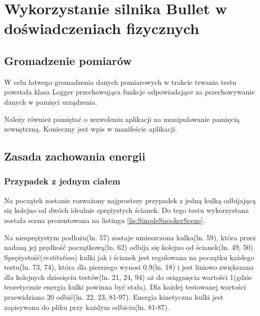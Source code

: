 \section{Wykorzystanie silnika Bullet w doświadczeniach fizycznych}

\subsection{Gromadzenie pomiarów}
W celu łatwego gromadzenia danych pomiarowych w trakcie trwania testu powstała
klasa Logger przechowująca funkcje odpowiadające za przechowywanie danych w
pamięci urządzenia.
  
Należy również pamiętać o zezwoleniu aplikacji na manipulowanie pamięcią
zewnętrzną. Konieczny jest wpis w manifeście aplikacji.


\subsection{Zasada zachowania energii}

\subsubsection{Przypadek z jednym ciałem}
Na początek zostanie rozważony najprostszy przypadek z jedną kulką odbijającą
się kolejno od dwóch idealnie sprężystych ścianek. Do tego testu wykorzystana
została scena prezentowana na listingu \ref{lis:SimpleSnookerScene}.
 
Na niesprężystym podłożu(ln. 57) zostaje umieszczona kulka(ln. 59), która przez
nadaną jej prędkość początkową(ln. 62) odbija się kolejno od ścianek(ln. 49,
50). Sprężystość(\emph{restitution}) kulki jak i ścianek jest regulowana na
początku każdego testu(ln. 73, 74), która dla pierszego wynosi 0.9(ln. 18) i
jest liniowo zwiększana dla kolejnych dziesięciu testów(ln. 21, 24, 94) aż do
osiągnięcia wartości 1(gdzie teoretycznie energia kulki powinna być stała).
Dla każdej testowanej wartości przewidziano 20 odbić(ln. 22, 23, 81-97). Energia
kinetyczna kulki jest zapisywana do pliku przy każdym odbiciu(ln. 81-87).


